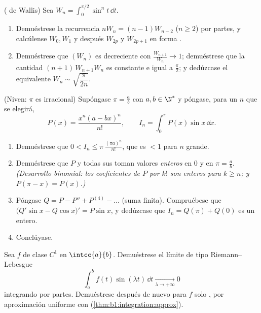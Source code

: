 \begin{exercise}[$\star\star\star$]\label{exo:b1:integration:8}
( de Wallis) Sea $W_n = \int_0^{\pi/2} \sin^n t\,\dd t$.
\begin{enumerate}
  \item Demuéstrese la recurrencia $n W_n = (n-1) W_{n-2}$
        ($n \geq 2$) por partes, y calcúlense $W_0, W_1$ y después
        $W_{2p}$ y $W_{2p+1}$ en forma .
  \item Demuéstrese que $(W_n)$ es decreciente con
        $\frac{W_{n+1}}{W_n} \to 1$; demuéstrese que la cantidad
        $(n+1)\,W_{n+1} W_n$ es constante e igual a $\frac\pi2$; y
        dedúzcase el equivalente $W_n \sim \sqrt{\dfrac{\pi}{2n}}$.
\end{enumerate}
\end{exercise}

\begin{exercise}[$\star\star\star$]\label{exo:b1:integration:9}
(Niven: $\pi$ es irracional) Supóngase $\pi = \frac ab$ con
$a, b \in \N^*$ y póngase, para un $n$ que se elegirá,
\[
P(x) = \frac{x^n (a - bx)^n}{n!},
\qquad
I_n = \int_0^{\pi} P(x)\sin x\, \dd x .
\]
\begin{enumerate}
  \item Demuéstrese que $0 < I_n \leq \pi\,\frac{(\pi a)^n}{n!}$,
        que es $< 1$ para $n$ grande.
  \item Demuéstrese que $P$ y todas sus  toman valores
        \emph{enteros} en $0$ y en $\pi = \frac ab$.
        \emph{(Desarrollo binomial: los coeficientes de $P$ por $k!$
        son enteros para $k \geq n$; y $P(\pi - x) = P(x)$.)}
  \item Póngase $Q = P - P'' + P^{(4)} - \dots$ (suma finita).
        Compruébese que
        $\bigl(Q'\sin x - Q\cos x\bigr)' = P \sin x$, y dedúzcase
        que $I_n = Q(\pi) + Q(0)$ es un entero.
  \item Conclúyase.
\end{enumerate}
\end{exercise}

\begin{exercise}[$\star\star\star$]\label{exo:b1:integration:10}
Sea $f$ de clase $C^1$ en $\intcc{a}{b}$. Demuéstrese el límite de
tipo Riemann--Lebesgue
\[
\int_a^b f(t)\sin(\lambda t)\,\dd t \xrightarrow[\lambda \to
+\infty]{} 0
\]
integrando por partes. Demuéstrese después de nuevo para $f$ solo
, por aproximación uniforme con 
(\cref{thm:b1:integration:approx}).
\end{exercise}

